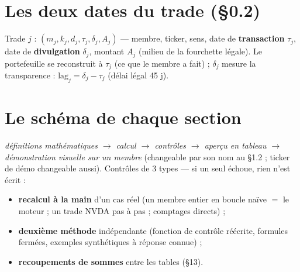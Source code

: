 \documentclass[10pt,a4paper,twocolumn]{article}
\begin{document}
\section{Les deux dates du trade (\S 0.2)}
Trade $j$ : $(m_j, k_j, d_j, \tau_j, \delta_j, A_j)$ --- membre, ticker, sens, date de
\textbf{transaction} $\tau_j$, date de \textbf{divulgation} $\delta_j$, montant $A_j$ (milieu de
la fourchette légale). Le portefeuille se reconstruit à $\tau_j$ (ce que le membre a fait) ;
$\delta_j$ mesure la transparence : $\mathrm{lag}_j = \delta_j - \tau_j$ (délai légal 45 j).

\section{Le schéma de chaque section}
\emph{définitions mathématiques $\to$ calcul $\to$ contrôles $\to$ aperçu en tableau $\to$
démonstration visuelle sur un membre} (changeable par son nom au \S 1.2 ; ticker de démo
changeable aussi). Contrôles de 3 types --- si un seul échoue, rien n'est écrit :
\begin{itemize}
  \item \textbf{recalcul à la main} d'un cas réel (un membre entier en boucle naïve $=$ le moteur ;
  un trade NVDA pas à pas ; comptages directs) ;
  \item \textbf{deuxième méthode} indépendante (fonction de contrôle réécrite, formules fermées,
  exemples synthétiques à réponse connue) ;
  \item \textbf{recoupements de sommes} entre les tables (\S 13).
\end{itemize}
\end{document}
